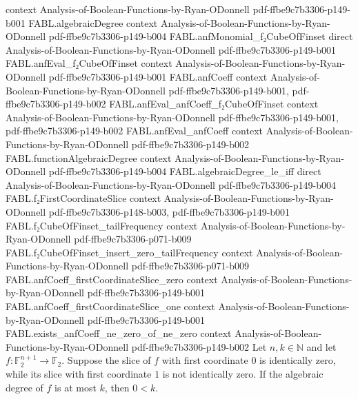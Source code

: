 \begin{theorem}
  {context}
  {Analysis-of-Boolean-Functions-by-Ryan-ODonnell}
  {pdf-ffbe9c7b3306-p149-b001}
\proofstep
  {FABL.algebraicDegree}
  {context}
  {Analysis-of-Boolean-Functions-by-Ryan-ODonnell}
  {pdf-ffbe9c7b3306-p149-b004}
\proofstep
  {FABL.anfMonomial_f₂CubeOfFinset}
  {direct}
  {Analysis-of-Boolean-Functions-by-Ryan-ODonnell}
  {pdf-ffbe9c7b3306-p149-b001}
\proofstep
  {FABL.anfEval_f₂CubeOfFinset}
  {context}
  {Analysis-of-Boolean-Functions-by-Ryan-ODonnell}
  {pdf-ffbe9c7b3306-p149-b001}
\proofstep
  {FABL.anfCoeff}
  {context}
  {Analysis-of-Boolean-Functions-by-Ryan-ODonnell}
  {pdf-ffbe9c7b3306-p149-b001,
    pdf-ffbe9c7b3306-p149-b002}
\proofstep
  {FABL.anfEval_anfCoeff_f₂CubeOfFinset}
  {context}
  {Analysis-of-Boolean-Functions-by-Ryan-ODonnell}
  {pdf-ffbe9c7b3306-p149-b001,
    pdf-ffbe9c7b3306-p149-b002}
\proofstep
  {FABL.anfEval_anfCoeff}
  {context}
  {Analysis-of-Boolean-Functions-by-Ryan-ODonnell}
  {pdf-ffbe9c7b3306-p149-b002}
\proofstep
  {FABL.functionAlgebraicDegree}
  {context}
  {Analysis-of-Boolean-Functions-by-Ryan-ODonnell}
  {pdf-ffbe9c7b3306-p149-b004}
\proofstep
  {FABL.algebraicDegree_le_iff}
  {direct}
  {Analysis-of-Boolean-Functions-by-Ryan-ODonnell}
  {pdf-ffbe9c7b3306-p149-b004}
\proofstep
  {FABL.f₂FirstCoordinateSlice}
  {context}
  {Analysis-of-Boolean-Functions-by-Ryan-ODonnell}
  {pdf-ffbe9c7b3306-p148-b003,
    pdf-ffbe9c7b3306-p149-b001}
\proofstep
  {FABL.f₂CubeOfFinset_tailFrequency}
  {context}
  {Analysis-of-Boolean-Functions-by-Ryan-ODonnell}
  {pdf-ffbe9c7b3306-p071-b009}
\proofstep
  {FABL.f₂CubeOfFinset_insert_zero_tailFrequency}
  {context}
  {Analysis-of-Boolean-Functions-by-Ryan-ODonnell}
  {pdf-ffbe9c7b3306-p071-b009}
\proofstep
  {FABL.anfCoeff_firstCoordinateSlice_zero}
  {context}
  {Analysis-of-Boolean-Functions-by-Ryan-ODonnell}
  {pdf-ffbe9c7b3306-p149-b001}
\proofstep
  {FABL.anfCoeff_firstCoordinateSlice_one}
  {context}
  {Analysis-of-Boolean-Functions-by-Ryan-ODonnell}
  {pdf-ffbe9c7b3306-p149-b001}
\proofstep
  {FABL.exists_anfCoeff_ne_zero_of_ne_zero}
  {context}
  {Analysis-of-Boolean-Functions-by-Ryan-ODonnell}
  {pdf-ffbe9c7b3306-p149-b002}
Let $n,k\in\mathbb{N}$ and let $f:\mathbb{F}_2^{n+1}\to\mathbb{F}_2$. Suppose the slice
of $f$ with first coordinate $0$ is identically zero, while its slice with first
coordinate $1$ is not identically zero. If the algebraic degree of $f$ is at most $k$,
then $0<k$.
\end{theorem}

